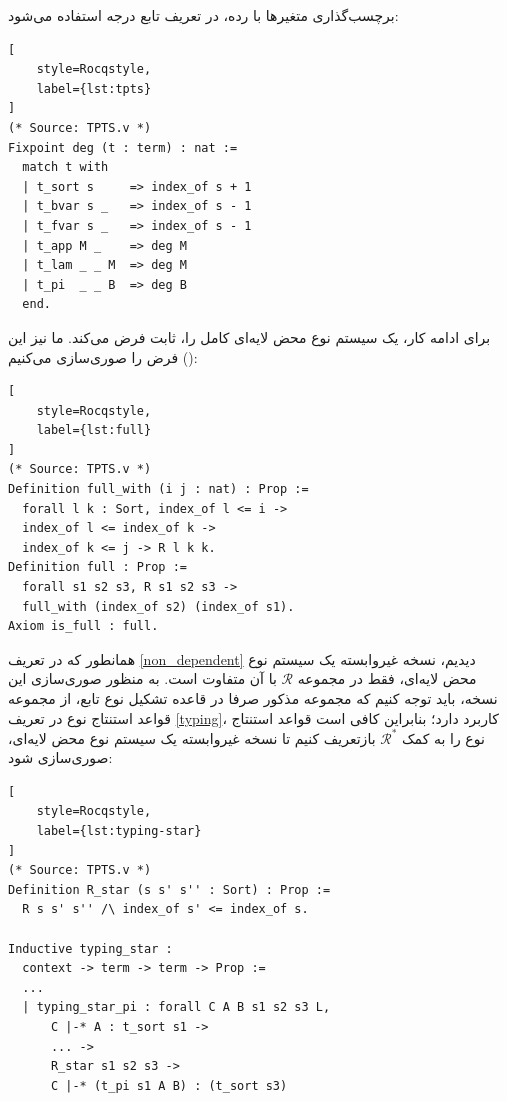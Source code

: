 \documentclass[11pt,twocolumn,a4paper,twoside]{article}
\theoremstyle{definition}
\theoremstyle{theorem}
\theoremstyle{definition}
\theoremstyle{definition}
\theoremstyle{definition}
\theoremstyle{definition}
\theoremstyle{definition}
\newcommand{\varname}[1]{\lr{\texttt{\footnotesize\detokenize{#1}}}}
\begin{document}
برچسب‌گذاری متغیرها با رده، در تعریف تابع درجه استفاده می‌شود:
\begin{latin}
\begin{lstlisting}[
    style=Rocqstyle,
    label={lst:tpts}
]
(* Source: TPTS.v *)
Fixpoint deg (t : term) : nat :=
  match t with
  | t_sort s     => index_of s + 1
  | t_bvar s _   => index_of s - 1
  | t_fvar s _   => index_of s - 1
  | t_app M _    => deg M
  | t_lam _ _ M  => deg M
  | t_pi  _ _ B  => deg B
  end.
\end{lstlisting}
\end{latin}

برای ادامه کار،  یک سیستم نوع محض لایه‌ای کامل را، ثابت فرض می‌کند. ما نیز این فرض را صوری‌سازی می‌کنیم (\varname{is_full}):
\begin{latin}
\begin{lstlisting}[
    style=Rocqstyle,
    label={lst:full}
]
(* Source: TPTS.v *)
Definition full_with (i j : nat) : Prop :=
  forall l k : Sort, index_of l <= i ->
  index_of l <= index_of k -> 
  index_of k <= j -> R l k k.
Definition full : Prop :=
  forall s1 s2 s3, R s1 s2 s3 -> 
  full_with (index_of s2) (index_of s1).
Axiom is_full : full.
\end{lstlisting}
\end{latin}

همانطور که در تعریف \ref{non_dependent} دیدیم، نسخه غیروابسته یک سیستم نوع محض لایه‌ای، فقط در مجموعه $\mathcal{R}$ با آن متفاوت است. به منظور صوری‌سازی این نسخه، باید توجه کنیم که مجموعه مذکور صرفا در قاعده تشکیل نوع تابع، از مجموعه قواعد استنتاج نوع در تعریف \ref{typing}، کاربرد دارد؛ بنابراین کافی است قواعد استنتاج نوع را به کمک $\mathcal{R}^*$ بازتعریف کنیم تا نسخه غیروابسته یک سیستم نوع محض لایه‌ای، صوری‌سازی شود:
\begin{latin}
\begin{lstlisting}[
    style=Rocqstyle,
    label={lst:typing-star}
]
(* Source: TPTS.v *)
Definition R_star (s s' s'' : Sort) : Prop :=
  R s s' s'' /\ index_of s' <= index_of s.

Inductive typing_star : 
  context -> term -> term -> Prop :=
  ...
  | typing_star_pi : forall C A B s1 s2 s3 L,
      C |-* A : t_sort s1 ->
      ... ->
      R_star s1 s2 s3 ->
      C |-* (t_pi s1 A B) : (t_sort s3)
\end{lstlisting}
\end{latin}
\end{document}
